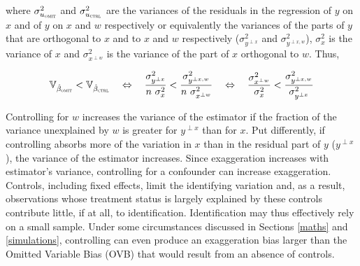 			where $\sigma^{2}_{u_{\textsc{omit}}}$ and $\sigma^{2}_{u_{\textsc{ctrl}}}$ are the variances of the residuals in the regression of $y$ on $x$ and of $y$ on $x$ and $w$ respectively or equivalently the variances of the parts of $y$ that are orthogonal to $x$ and to $x$ and $w$ respectively ($\sigma^{2}_{y^{\perp x}}$ and $\sigma^{2}_{y^{\perp x, w}}$), $\sigma^{2}_{x}$ is the variance of $x$ and $\sigma^{2}_{x^{\perp w}}$ is the variance of the part of $x$ orthogonal to $w$. Thus,
			
			\[
				\mathbb{V}_{\hat{\beta}_{\textsc{omit}}} <  \mathbb{V}_{\hat{\beta}_{\textsc{ctrl}}}
                   		\quad \Leftrightarrow \quad 
				\dfrac{\sigma^{2}_{y^{\perp x}}}{n \ \sigma_{x}^{2}} < \dfrac{\sigma^{2}_{y^{\perp x, w}}}{n \ \sigma_{x^{\perp w}}^{2}}
				\quad \Leftrightarrow \quad 
				\dfrac{\sigma^{2}_{x^{\perp w}}}{\sigma_{x}^{2}} <
				\dfrac{\sigma^{2}_{y^{\perp x, w}}}{ \sigma_{y^{\perp x}}^{2}}
			\]
			
			Controlling for $w$ increases the variance of the estimator if the fraction of the variance unexplained by $w$ is greater for $y^{\perp x}$ than for $x$. Put differently, if controlling absorbs more of the variation in $x$ than in the residual part of $y$ ($y^{\perp x}$), the variance of the estimator increases. Since exaggeration increases with estimator's variance, controlling for a confounder can increase exaggeration. Controls, including fixed effects, limit the identifying variation and, as a result, observations whose treatment status is largely explained by these controls contribute little, if at all, to identification. Identification may thus effectively rely on a small sample. Under some circumstances discussed in Sections \ref{maths} and \ref{simulations}, controlling can even produce an exaggeration bias larger than the Omitted Variable Bias (OVB) that would result from an absence of controls. 
			
